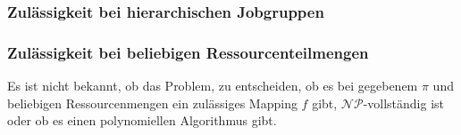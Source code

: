 \documentclass{scrreprt}
\begin{document}
\subsubsection{Zulässigkeit bei hierarchischen Jobgruppen}
%


\subsubsection{Zulässigkeit bei beliebigen Ressourcenteilmengen}
\label{subsubsec:ZulaessigkeitBeiBeliebigenRessourcenteilmengen}
Es ist nicht bekannt, ob das Problem, zu entscheiden, ob es bei gegebenem $\pi$ und beliebigen Ressourcenmengen ein zulässiges Mapping $f$ gibt, 
$\mathcal{NP}$-vollständig ist oder ob es einen polynomiellen Algorithmus gibt.
\end{document}
